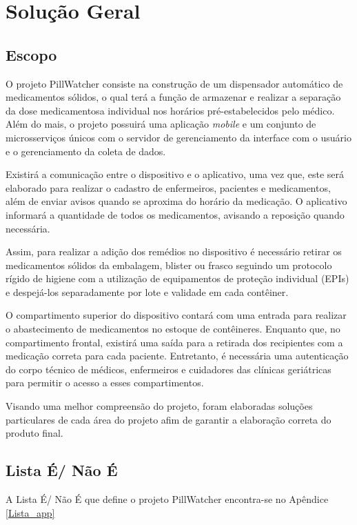\chapter[Solução Geral]{Solução Geral}
\section{Escopo}
O projeto PillWatcher consiste na construção de um dispensador automático de medicamentos sólidos, o qual terá a função de armazenar e realizar a separação da dose medicamentosa individual nos horários pré-estabelecidos pelo médico. Além do mais, o projeto possuirá uma aplicação \textit{mobile} e um conjunto de microsserviços únicos com o servidor de gerenciamento da interface com o usuário e o gerenciamento da coleta de dados.

Existirá a comunicação entre o dispositivo e o aplicativo, uma vez que, este será elaborado para realizar o cadastro de enfermeiros, pacientes e medicamentos, além de enviar avisos quando se aproxima do horário da medicação. O aplicativo informará a quantidade de todos os medicamentos, avisando a reposição quando necessária.

Assim, para realizar a adição dos remédios no dispositivo é necessário retirar os medicamentos sólidos da embalagem, blister ou frasco seguindo um protocolo rígido de higiene com a utilização de equipamentos de proteção individual (EPIs) e despejá-los separadamente por lote e validade em cada contêiner.

O compartimento superior do dispositivo contará com uma entrada para realizar o abastecimento de medicamentos no estoque de contêineres. Enquanto que, no compartimento frontal, existirá uma saída para a retirada dos recipientes com a medicação correta para cada paciente. Entretanto, é necessária uma autenticação do corpo técnico de médicos, enfermeiros e cuidadores das clínicas geriátricas para permitir o acesso a esses compartimentos.

Visando uma melhor compreensão do projeto, foram elaboradas soluções particulares de cada área do projeto afim de garantir a elaboração correta do produto final.

\section{Lista É/ Não É}
A Lista É/ Não É que define o projeto PillWatcher encontra-se no Apêndice \ref{Lista_app}

